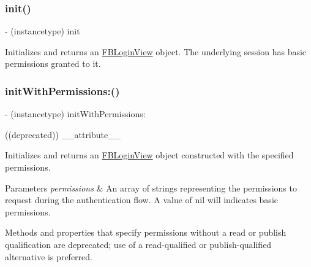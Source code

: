 \subsubsection{\texorpdfstring{init()}{init()}\hspace{0.1cm}{\footnotesize\ttfamily [5/5]}}
{\footnotesize\ttfamily -\/ (instancetype) init \begin{DoxyParamCaption}{ }\end{DoxyParamCaption}}

Initializes and returns an {\ttfamily \hyperlink{interfaceFBLoginView}{F\+B\+Login\+View}} object. The underlying session has basic permissions granted to it. \mbox{\label{interfaceFBLoginView_a0fb6885fd07aa64c90378c9abcfd06a4}} 
\subsubsection{\texorpdfstring{init\+With\+Permissions\+:()}{initWithPermissions:()}\hspace{0.1cm}{\footnotesize\ttfamily [1/5]}}
{\footnotesize\ttfamily -\/ (instancetype) init\+With\+Permissions\+: \begin{DoxyParamCaption}\item[{((deprecated))}]{\+\_\+\+\_\+attribute\+\_\+\+\_\+ }\end{DoxyParamCaption}}

Initializes and returns an {\ttfamily \hyperlink{interfaceFBLoginView}{F\+B\+Login\+View}} object constructed with the specified permissions.


\begin{DoxyParams}{Parameters}
{\em permissions} & An array of strings representing the permissions to request during the authentication flow. A value of nil will indicates basic permissions.\\
\hline
\end{DoxyParams}
Methods and properties that specify permissions without a read or publish qualification are deprecated; use of a read-\/qualified or publish-\/qualified alternative is preferred. \mbox{\label{interfaceFBLoginView_a0fb6885fd07aa64c90378c9abcfd06a4}} 
